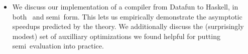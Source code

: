 \begin{itemize}

\item We discuss our implementation of a compiler from Datafun to Haskell, in
  both \naive\ and semi\naive\ form. This lets us empirically demonstrate the
  asymptotic speedups predicted by the theory. We additionally discuss the
  (surprisingly modest) set of auxilliary optimizations we found helpful for
  putting semi\naive\ evaluation into practice.
\end{itemize}
